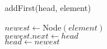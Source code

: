 \documentclass{article}
\begin{document}
\begin{algorithm}
\caption{addFirst(head, element)}
$newest\gets$Node$(element)$ \\
$newest.next\gets head$ \\
$head\gets newest$
\end{algorithm}
\end{document}
